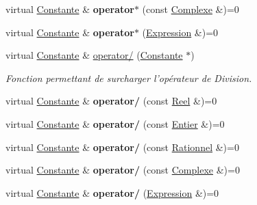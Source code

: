 \begin{DoxyCompactItemize}
\item 
\hypertarget{class_constante_a65a3360420827c4c7953052ff87b2457}{virtual \hyperlink{class_constante}{Constante} \& {\bfseries operator$\ast$} (const \hyperlink{class_complexe}{Complexe} \&)=0}\label{class_constante_a65a3360420827c4c7953052ff87b2457}

\item 
\hypertarget{class_constante_a51016ec3398e1a5f2ba4cea752c5c7db}{virtual \hyperlink{class_constante}{Constante} \& {\bfseries operator$\ast$} (\hyperlink{class_expression}{Expression} \&)=0}\label{class_constante_a51016ec3398e1a5f2ba4cea752c5c7db}

\item 
virtual \hyperlink{class_constante}{Constante} \& \hyperlink{class_constante_a9be1827fd118f5a81cf10b509b64cfa7}{operator/} (\hyperlink{class_constante}{Constante} $\ast$)
\begin{DoxyCompactList}\small\item\em Fonction permettant de surcharger l'opérateur de Division. \end{DoxyCompactList}\item 
\hypertarget{class_constante_a0355225f82499fabe7e64a5a09866fdb}{virtual \hyperlink{class_constante}{Constante} \& {\bfseries operator/} (const \hyperlink{class_reel}{Reel} \&)=0}\label{class_constante_a0355225f82499fabe7e64a5a09866fdb}

\item 
\hypertarget{class_constante_ac90f8c29c86fa9ccb15a44c64b14ee87}{virtual \hyperlink{class_constante}{Constante} \& {\bfseries operator/} (const \hyperlink{class_entier}{Entier} \&)=0}\label{class_constante_ac90f8c29c86fa9ccb15a44c64b14ee87}

\item 
\hypertarget{class_constante_a8c0dfdc199f6a8feff5038abf75c2b98}{virtual \hyperlink{class_constante}{Constante} \& {\bfseries operator/} (const \hyperlink{class_rationnel}{Rationnel} \&)=0}\label{class_constante_a8c0dfdc199f6a8feff5038abf75c2b98}

\item 
\hypertarget{class_constante_a5944c154c12015c0af36ef5fdb2e851b}{virtual \hyperlink{class_constante}{Constante} \& {\bfseries operator/} (const \hyperlink{class_complexe}{Complexe} \&)=0}\label{class_constante_a5944c154c12015c0af36ef5fdb2e851b}

\item 
\hypertarget{class_constante_a2c2e07511d0e5883ef337351b2121606}{virtual \hyperlink{class_constante}{Constante} \& {\bfseries operator/} (\hyperlink{class_expression}{Expression} \&)=0}\label{class_constante_a2c2e07511d0e5883ef337351b2121606}


\end{DoxyCompactItemize}
